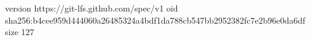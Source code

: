 version https://git-lfs.github.com/spec/v1
oid sha256:b4cee959d444060a26485324a4bdf1da788cb547bb2952382fc7e2b96e0da6df
size 127
